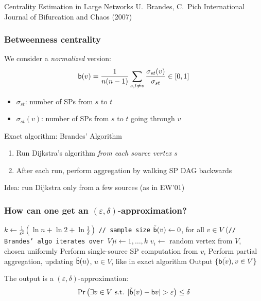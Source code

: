 \begin{frame}
  \centering
  \vfill
  {\Huge Centrality Estimation in Large Networks}
  \vfill
  {\Large U.~Brandes, C.~Pich}
  \vfill
  {\large International Journal of Bifurcation and Chaos (2007)}
  \vfill
\end{frame}

\begin{frame}
  \frametitle{Betweenness centrality}
  We consider a \emph{normalized} version:
  \[
    \mathsf{b}(v)=\frac{1}{n(n-1)}\sum_{s,t\neq v}\frac{\sigma_{st}(v)}{\sigma_{st}}\in[0,1]
  \]
  \begin{itemize}
    \item $\sigma_{st}$: number of SPs from $s$ to $t$
    \item $\sigma_{st}(v)$: number of SPs from $s$ to $t$ going through $v$
  \end{itemize}
  \pause
  Exact algorithm: Brandes' Algorithm
  \begin{enumerate}
    \item Run Dijkstra's algorithm \emph{from each source vertex $s$}
    \item After each run, perform aggregation by walking SP DAG backwards
  \end{enumerate}
  \pause
  Idea: run Dijkstra only from a few sources (as in EW'01)
\end{frame}

\begin{frame}
  \frametitle{How can one get an $(\varepsilon,\delta)$-approximation?}
  \begin{algorithm}[H]
    \DontPrintSemicolon
    $k\leftarrow \frac{1}{\varepsilon^2}\left(\ln n + \ln 2 +
    \ln\frac{1}{\delta}\right)$ \texttt{// sample size}\;
    $\tilde{\mathsf{b}}(v)\leftarrow 0$, for all $v\in V$\;
    \For(\texttt{// Brandes' algo iterates over $V$}){$i\leftarrow 1,\dotsc,k$} {
      $v_i \leftarrow$ random vertex from $V$, chosen uniformly\;
      Perform single-source SP computation from $v_i$\;
      Perform partial aggregation, updating $\tilde{\mathsf{b}}(u)$, $u\in V$,
      like in exact algorithm\;
    }
    Output $\{\tilde{\mathsf{b}(v)}, v\in V\}$\;
  \end{algorithm}
  \vfill
  \pause
  \begin{theorem}
    The output is a $(\varepsilon,\delta)$-approximation:
    \[
      \Pr\left(\exists v\in V \text{ s.t. }
      |\tilde{\betw}(v)-\betw{v}|>\varepsilon\right)\le \delta
    \]
  \end{theorem}
\end{frame}

